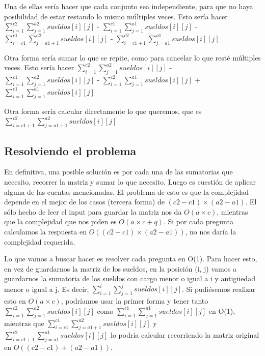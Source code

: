 Una de ellas sería hacer que cada conjunto sea independiente, para que no haya posibilidad de estar restando lo mismo múltiples veces. Esto sería hacer $\sum_{i = 1}^{c2} \sum_{j = 1}^{a2} sueldos[i][j]$ - $\sum_{i = 1}^{c1} \sum_{j = 1}^{a1} sueldos[i][j]$ - $\sum_{i = c1}^{c1} \sum_{j = a1 + 1}^{a2} sueldos[i][j]$ - $\sum_{i = c1 + 1}^{c2} \sum_{j = a1}^{a1} sueldos[i][j]$  \newline

Otra forma sería sumar lo que se repite, como para cancelar lo que resté múltiples veces. Esto sería hacer $\sum_{i = 1}^{c2} \sum_{j = 1}^{a2} sueldos[i][j]$ - $\sum_{i = 1}^{c1} \sum_{j = 1}^{a2} sueldos[i][j]$ - $\sum_{i = 1}^{c2} \sum_{j = 1}^{a1} sueldos[i][j]$ + $\sum_{i = 1}^{c1} \sum_{j = 1}^{a1} sueldos[i][j]$  \newline

Otra forma sería calcular directamente lo que queremos, que es $\sum_{i = c1 + 1}^{c2} \sum_{j = a1 + 1}^{a2} sueldos[i][j]$

\subsection{Resolviendo el problema}

En definitiva, una posible solución es por cada una de las sumatorias que necesito, recorrer la matriz y sumar lo que necesito. Luego es cuestión de aplicar alguna de las cuentas mencionadas. El problema de esto es que la complejidad depende en el mejor de los casos (tercera forma) de $(c2 - c1) \times (a2 - a1)$. El sólo hecho de leer el input para guardar la matriz nos da $O(a \times c)$, mientras que la complejidad que nos piden es $O(a \times c + q)$. Si por cada pregunta calculamos la respuesta en $O((c2 - c1) \times (a2 - a1))$, no nos daría la complejidad requerida.  \newline

Lo que vamos a buscar hacer es resolver cada pregunta en O(1). Para hacer esto, en vez de guardarnos la matriz de los sueldos, en la posición (i, j) vamos a guardarnos la sumatoria de los sueldos con cargo menor o igual a i y antigüedad menor o igual a j. Es decir, $\sum_{i = 1}^{i} \sum_{j = 1}^{j} sueldos[i][j]$. Si pudiésemos realizar esto en $O(a \times c)$, podríamos usar la primer forma y tener tanto $\sum_{i = 1}^{c2} \sum_{j = 1}^{a2} sueldos[i][j]$ como $\sum_{i = 1}^{c1} \sum_{j = 1}^{a1} sueldos[i][j]$ en O(1), mientras que $\sum_{i = c1}^{c1} \sum_{j = a1 + 1}^{a2} sueldos[i][j]$ y $\sum_{i = c1 + 1}^{c2} \sum_{j = a1}^{a1} sueldos[i][j]$ lo podría calcular recorriendo la matriz original en $O((c2 - c1) + (a2 - a1))$.  \newline

